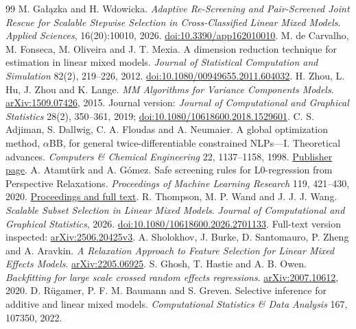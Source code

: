 \documentclass[preprint,11pt,numbers]{elsarticle}
\theoremstyle{remark}\newtheorem{remark}[theorem]{Remark}
\begin{document}
\clearpage
\begin{thebibliography}{99}\small
{} M. Ga\l{}\k{a}zka and H. Wdowicka.
\emph{Adaptive Re-Screening and Pair-Screened Joint Rescue for Scalable Stepwise
Selection in Cross-Classified Linear Mixed Models}. \emph{Applied Sciences}, 16(20):10010, 2026. \href{https://doi.org/10.3390/app162010010}{doi:10.3390/app162010010}.
 M. de Carvalho, M. Fonseca, M. Oliveira and J. T. Mexia.
A dimension reduction technique for estimation in linear mixed models.
\emph{Journal of Statistical Computation and Simulation} 82(2), 219--226, 2012.
\href{https://doi.org/10.1080/00949655.2011.604032}{doi:10.1080/00949655.2011.604032}.
 H. Zhou, L. Hu, J. Zhou and K. Lange.
\emph{MM Algorithms for Variance Components Models}.
\href{https://arxiv.org/abs/1509.07426}{arXiv:1509.07426}, 2015.
Journal version: \emph{Journal of Computational and Graphical Statistics}
28(2), 350--361, 2019; \href{https://doi.org/10.1080/10618600.2018.1529601}{doi:10.1080/10618600.2018.1529601}.
 C. S. Adjiman, S. Dallwig, C. A. Floudas and A. Neumaier.
A global optimization method, $\alpha$BB, for general twice-differentiable
constrained NLPs---I. Theoretical advances.
\emph{Computers \& Chemical Engineering} 22, 1137--1158, 1998.
\href{https://www.sciencedirect.com/science/article/pii/S0098135498000271}{Publisher page}.
 A. Atamt\"urk and A. G\'omez.
Safe screening rules for L0-regression from Perspective Relaxations.
\emph{Proceedings of Machine Learning Research} 119, 421--430, 2020.
\href{https://proceedings.mlr.press/v119/atamturk20a.html}{Proceedings and full text}.
 R. Thompson, M. P. Wand and J. J. J. Wang.
\emph{Scalable Subset Selection in Linear Mixed Models}.
\emph{Journal of Computational and Graphical Statistics}, 2026. \href{https://doi.org/10.1080/10618600.2026.2701133}{doi:10.1080/10618600.2026.2701133}. Full-text version inspected: \href{https://arxiv.org/html/2506.20425v3}{arXiv:2506.20425v3}.
 A. Sholokhov, J. Burke, D. Santomauro, P. Zheng and A. Aravkin.
\emph{A Relaxation Approach to Feature Selection for Linear Mixed Effects Models}.
\href{https://arxiv.org/abs/2205.06925}{arXiv:2205.06925}.
 S. Ghosh, T. Hastie and A. B. Owen.
\emph{Backfitting for large scale crossed random effects regressions}.
\href{https://arxiv.org/abs/2007.10612}{arXiv:2007.10612}, 2020.
 D. R\"ugamer, P. F. M. Baumann and S. Greven.
Selective inference for additive and linear mixed models.
\emph{Computational Statistics \& Data Analysis} 167, 107350, 2022.

\end{thebibliography}
\end{document}
